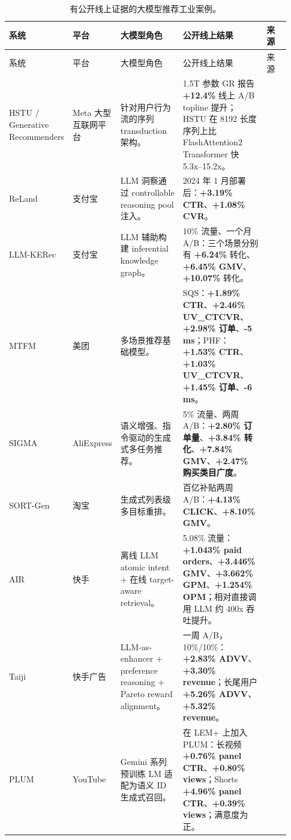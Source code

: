 \documentclass[UTF8,fontset=fandol,11pt]{ctexart}
\newcommand{\metric}[1]{\textbf{#1}}
\begin{document}
\small
\begin{longtable}{@{}p{0.12\linewidth}p{0.15\linewidth}p{0.24\linewidth}p{0.32\linewidth}p{0.10\linewidth}@{}}
\caption{有公开线上证据的大模型推荐工业案例。}
\label{tab:ab-zh}\\
\toprule
系统 & 平台 & 大模型角色 & 公开线上结果 & 来源\\
\midrule
\endfirsthead
\toprule
系统 & 平台 & 大模型角色 & 公开线上结果 & 来源\\
\midrule
\endhead
HSTU / Generative Recommenders & Meta 大型互联网平台 & 针对用户行为流的序列 transduction 架构。 & 1.5T 参数 GR 报告 \metric{+12.4\%} 线上 A/B topline 提升；HSTU 在 8192 长度序列上比 FlashAttention2 Transformer 快 5.3x--15.2x。 & \cite{hstu}\\
ReLand & 支付宝 & LLM 洞察通过 controllable reasoning pool 注入。 & 2024 年 1 月部署后：\metric{+3.19\% CTR}、\metric{+1.08\% CVR}。 & \cite{reland}\\
LLM-KERec & 支付宝 & LLM 辅助构建 inferential knowledge graph。 & 10\% 流量、一个月 A/B：三个场景分别有 \metric{+6.24\%} 转化、\metric{+6.45\% GMV}、\metric{+10.07\%} 转化。 & \cite{llmkerec}\\
MTFM & 美团 & 多场景推荐基础模型。 & SQS：\metric{+1.89\% CTR}、\metric{+2.46\% UV\_CTCVR}、\metric{+2.98\% 订单}、\metric{-5 ms}；PHF：\metric{+1.53\% CTR}、\metric{+1.03\% UV\_CTCVR}、\metric{+1.45\% 订单}、\metric{-6 ms}。 & \cite{mtfm}\\
SIGMA & AliExpress & 语义增强、指令驱动的生成式多任务推荐。 & 5\% 流量、两周 A/B：\metric{+2.80\% 订单量}、\metric{+3.84\% 转化}、\metric{+7.84\% GMV}、\metric{+2.47\% 购买类目广度}。 & \cite{sigma}\\
SORT-Gen & 淘宝 & 生成式列表级多目标重排。 & 百亿补贴两周 A/B：\metric{+4.13\% CLICK}、\metric{+8.10\% GMV}。 & \cite{sortgen}\\
AIR & 快手 & 离线 LLM atomic intent + 在线 target-aware retrieval。 & 5.08\% 流量：\metric{+1.043\% paid orders}、\metric{+3.446\% GMV}、\metric{+3.662\% GPM}、\metric{+1.254\% OPM}；相对直接调用 LLM 约 400x 吞吐提升。 & \cite{air}\\
Taiji & 快手广告 & LLM-as-enhancer + preference reasoning + Pareto reward alignment。 & 一周 A/B，10\%/10\%：\metric{+2.83\% ADVV}、\metric{+3.30\% revenue}；长尾用户 \metric{+5.26\% ADVV}、\metric{+5.32\% revenue}。 & \cite{taiji}\\
PLUM & YouTube & Gemini 系列预训练 LM 适配为语义 ID 生成式召回。 & 在 LEM+ 上加入 PLUM：长视频 \metric{+0.76\% panel CTR}、\metric{+0.80\% views}；Shorts \metric{+4.96\% panel CTR}、\metric{+0.39\% views}；满意度为正。 & \cite{plum}\\

\end{longtable}
\end{document}
